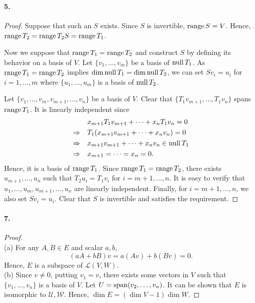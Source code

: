   \paragraph{5.}
  \begin{proof}
    Suppose that such an $S$ exists. Since $S$ is invertible, $\operatorname{range} S=V$.
    Hence, $\operatorname{range} T_2 = \operatorname{range} T_2S = \operatorname{range} T_1$. \par
    Now we suppose that $\operatorname{range} T_1=\operatorname{range} T_2$ and construct $S$ by defining
    its behavior on a basis of $V$. Let $\{v_1,\dots,v_m\}$ be a basis of $\operatorname{null}
    T_1$. As $\operatorname{range} T_1=\operatorname{range} T_2$ implies $\dim\operatorname{null} T_1=\dim\operatorname{null} T_2$, we can
    set $Sv_i = u_i$ for $i=1,\dots,m$ where $\{u_1,\dots,u_m\}$ is a basis of 
    $\operatorname{null} T_2$. \par
    Let $\{v_1,\dots,v_m,v_{m+1},\dots,v_n\}$ be a basis of $V$. Clear that $\{
    T_1v_{m+1},\dots,T_1v_n\}$ spans $\operatorname{range} T_1$. It is linearly independent
    since 
    \begin{align*}
      & x_{m+1}T_1v_{m+1}+\cdots+x_nT_1v_n = 0 \\
      \Rightarrow\quad& T_1(x_{m+1}v_{m+1}+\cdots+x_nv_n) = 0 \\
      \Rightarrow\quad& x_{m+1}v_{m+1}+\cdots+x_nv_n \in \operatorname{null} T_1 \\
      \Rightarrow\quad& x_{m+1} = \cdots = x_n = 0.
    \end{align*}
    Hence, it is a basis of $\operatorname{range} T_1$. Since $\operatorname{range} T_1=\operatorname{range} T_2$, there 
    exists $u_{m+1},\dots,u_n$ such that $T_2u_i = T_1v_i$ for $i=m+1,\dots,n$.
    It is easy to verify that $u_1,\dots,u_m,u_{m+1},\dots,u_n$ are linearly
    independent. Finally, for $i=m+1,\dots,n$, we also set $Sv_i = u_i$. Clear 
    that $S$ is invertible and satisfies the requirement.
  \end{proof}

  \paragraph{7.}
  \begin{proof}
    $\,$\\
    (a) For any $A,B\in E$ and scalar $a,b$,
    \[
      (aA+bB)v = a(Av) + b(Bv) = 0.
    \]
    Hence, $E$ is a subspace of $\mathcal{L}(V,W)$. \\
    (b) Since $v\ne 0$, putting $v_1=v$, there exists some vectors in $V$ such
    that $\{v_1,\dots,v_n\}$ is a basis of $V$. Let $U=\operatorname{span}(v_2,\dots,v_n)$. It
    can be shown that $E$ is isomorphic to $\mathcal{U,W}$. Hence, $\dim E = 
    (\dim V-1)\dim W$.
  \end{proof}

